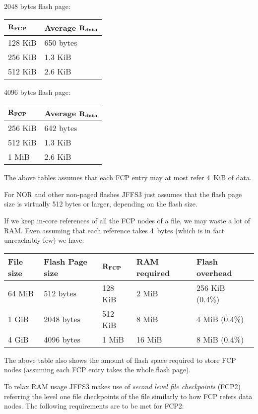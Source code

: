 \documentclass[12pt,a4paper,oneside,titlepage]{article}
\begin{document}
\begin{description}
2048 bytes flash page:
\begin{center}
\begin{tabular}{ll}
$\bf R_{FCP}$ & \textbf{Average $\bf R_{data}$}\\
\hline
128 KiB & 650 bytes\\
256 KiB & 1.3 KiB\\
512 KiB & 2.6 KiB\\
\end{tabular}
\end{center}

4096 bytes flash page:
\begin{center}
\begin{tabular}{ll}
$\bf R_{FCP}$ & \textbf{Average $\bf R_{data}$}\\
\hline
256 KiB & 642 bytes\\
512 KiB & 1.3 KiB\\
1 MiB   & 2.6 KiB\\
\end{tabular}
\end{center}

The above tables assumes that each FCP entry may at most refer 4~KiB of data.

For NOR and other non-paged flashes JFFS3 just assumes that
the flash page size is virtually 512 bytes or larger, depending on the
flash size.
\end{description}

If we keep in-core references of all the FCP nodes of a file, we may
waste a lot of RAM. Even assuming that each reference takes 4~bytes
(which is in fact unreachably few) we have:
\begin{center}
\begin{tabular}{lllll}
\textbf{File size} & \textbf{Flash Page size} &
$\bf R_{FCP}$ & \textbf{RAM required} &
\textbf{Flash overhead}\\
\hline
64 MiB  & 512 bytes  & 128 KiB & 2 MiB  & 256 KiB (0.4\%)\\
1 GiB   & 2048 bytes & 512 KiB & 8 MiB  & 4 MiB (0.4\%)\\
4 GiB   & 4096 bytes & 1 MiB   & 16 MiB & 8 MiB (0.4\%)\\
\end{tabular}
\end{center}

The above table also shows the amount of flash space required to store
FCP nodes (assuming each FCP entry takes the whole flash page).

To relax RAM usage JFFS3 makes use of \emph{second level file
checkpoints} (FCP2) referring
the level one file checkpoints of the file similarly to how FCP refers
data nodes. The following requirements are to be met for FCP2:
\end{document}
